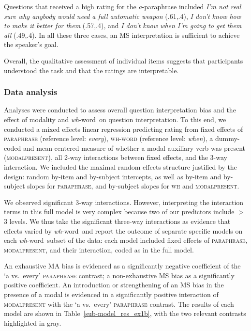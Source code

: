 \documentclass[12pt,letterpaper,table,svgnames,dvipsnames]{article}
\newcommand{\tableref}[1]{Table~\ref{#1}}
\newcommand{\whw}{\emph{wh}-word~}
\begin{document}
Questions that received a high rating for the \emph{a}-paraphrase included
\emph{I’m not real sure why anybody would need a full automatic weapon} (.61,.4), 
\emph{I don’t know how to make it better for them} (.57,.4), and 
\emph{I don’t know when I’m going to get them all} (.49,.4). In all these three cases, an MS interpretation is sufficient to achieve the speaker's goal.

Overall, the qualitative assessment of individual items suggests that participants understood the task and that the ratings are interpretable.




\subsubsection{Data analysis}
Analyses were conducted to assess overall question interpretation bias and the effect of modality and \whw on question interpretation. To this end, we conducted a mixed effects linear regression predicting rating from fixed effects of \textsc{paraphrase} (reference level: \emph{every}), \textsc{wh-word} (reference level: \emph{when}), a dummy-coded and mean-centered measure of whether a modal auxiliary verb was present (\textsc{modalpresent}), all 2-way interactions between fixed effects, and the 3-way interaction. We included the maximal random effects structure justified by the design: random by-item and by-subject intercepts, as well as by-item and by-subject slopes for \textsc{paraphrase}, and by-subject slopes for \textsc{wh} and \textsc{modalpresent}. 

We observed significant 3-way interactions. %
However, interpreting the interaction terms in this full model is very complex because two of our predictors include $>$ 3 levels. We thus take the significant three-way interactions as evidence that effects varied by \whw and  report the outcome of separate specific models on each \whw subset of the data: each model included fixed effects of \textsc{paraphrase}, \textsc{modalpresent}, and their interaction, coded as in the full model. 

An exhaustive MA bias is evidenced as a significantly negative coefficient of the `a vs.~every' \textsc{paraphrase} contrast; a non-exhaustive MS bias as a significantly positive coefficient. An introduction or strengthening of an MS bias in the presence of a modal is evidenced in a significantly positive interaction of \textsc{modalpresent} with the `a vs.~every' \textsc{paraphrase} contrast. The results of each model are shown in \tableref{sub-model_res_ex1b}, with the two relevant contrasts highlighted in gray.
\end{document}

